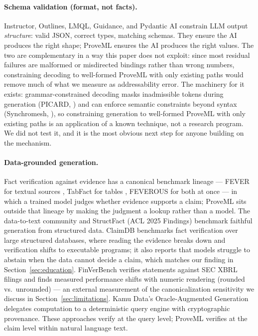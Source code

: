\documentclass[11pt,a4paper]{article}
\begin{document}
\paragraph{Schema validation (format, not facts).} Instructor, Outlines, LMQL, Guidance, and Pydantic AI constrain LLM output \textit{structure}: valid JSON, correct types, matching schemas. They ensure the AI produces the right shape; ProveML ensures the AI produces the right values. The two are complementary in a way this paper does not exploit: since most residual failures are malformed or misdirected bindings rather than wrong numbers, constraining decoding to well-formed ProveML with only existing paths would remove much of what we measure as addressability error. The machinery for it exists: grammar-constrained decoding masks inadmissible tokens during generation (PICARD, \citealp{picard}) and can enforce semantic constraints beyond syntax (Synchromesh, \citealp{synchromesh}), so constraining generation to well-formed ProveML with only existing paths is an application of a known technique, not a research program. We did not test it, and it is the most obvious next step for anyone building on the mechanism.

\paragraph{Data-grounded generation.} Fact verification against evidence has a canonical benchmark lineage --- FEVER for textual sources \citep{fever}, TabFact for tables \citep{tabfact}, FEVEROUS for both at once \citep{feverous} --- in which a trained model judges whether evidence supports a claim; ProveML sits outside that lineage by making the judgment a lookup rather than a model. The data-to-text community \citep{totto} and StructFact (ACL 2025 Findings) benchmark faithful generation from structured data. ClaimDB \citep{claimdb} benchmarks fact verification over large structured databases, where reading the evidence breaks down and verification shifts to executable programs; it also reports that models struggle to abstain when the data cannot decide a claim, which matches our finding in Section~\ref{sec:education}. FinVerBench \citep{finverbench} verifies statements against SEC XBRL filings and finds measured performance shifts with numeric rendering (rounded vs.\ unrounded) --- an external measurement of the canonicalization sensitivity we discuss in Section~\ref{sec:limitations}. Kamu Data's Oracle-Augmented Generation \citep{oraclegen} delegates computation to a deterministic query engine with cryptographic provenance. These approaches verify at the query level; ProveML verifies at the claim level within natural language text.
\end{document}
